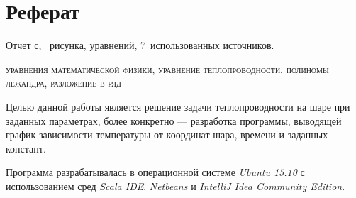 \section*{Реферат} 

Отчет \pageref*{LastPage} с,  \totfig{}~рисунка, \toteq{} уравнений, 7~использованных источников. %

\begin{large}
\textsc{уравнения математической физики, уравнение теплопроводности, полиномы лежандра, разложение в ряд}
\end{large}
	
	Целью данной работы является решение задачи теплопроводности на шаре при заданных параметрах, более конкретно --- разработка программы, выводящей график зависимости температуры от координат шара, времени и заданных констант. 
	
	Программа разрабатывалась в операционной системе \textit{Ubuntu 15.10} с использованием сред  \textit{Scala IDE}, \textit{Netbeans} и  \textit{IntelliJ Idea Community Edition}. 
\newpage